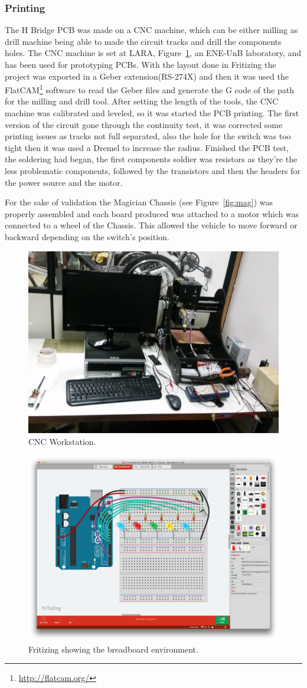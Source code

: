     \subsubsection{Printing} %
    \label{ssub:printing}
        The H Bridge PCB was made on a CNC machine, which can be either milling as drill machine being able to made the circuit tracks and drill the components holes. The CNC machine is set at LARA, Figure~\ref{fig:workstation}, an ENE-UnB laboratory, and has been used for prototyping PCBs. With the layout done in Fritizing the project was exported in a Geber extension(RS-274X) and then it was used the FlatCAM\footnote{\url{http://flatcam.org/}} software to read the Geber files and generate the G code of the path for the milling and drill tool. After setting the length of the tools, the CNC machine was calibrated and leveled, so it was started the PCB printing. The first version of the circuit gone through the continuity test, it was corrected some printing issues as tracks not full separated, also the hole for the switch was too tight then it was used a Dremel to increase the radius. Finished the PCB test, the soldering had began, the first components soldier was resistors as they're the less problematic components, followed by the transistors and then the headers for the power source and the motor.
	
	For the sake of validation the Magician Chassis (see Figure~\ref{fig:mag}) was properly assembled and each board produced was attached to a motor which was connected to a wheel of the Chassis. This allowed the vehicle to move forward or backward depending on the switch's position.

\begin{figure}[t]
\centering
\centering%
\includegraphics[height=.35\textwidth]{img/workstation_cnc.jpg}
\caption{CNC Workstation.}
\label{fig:workstation}%
\end{figure}

\begin{figure}[t]
\centering
\centering%
\includegraphics[height=.35\textwidth]{img/FritzingBreadBoard.png}
\caption{Fritizing showing the breadboard environment.}
\label{fig:breadboard}%
\end{figure}

